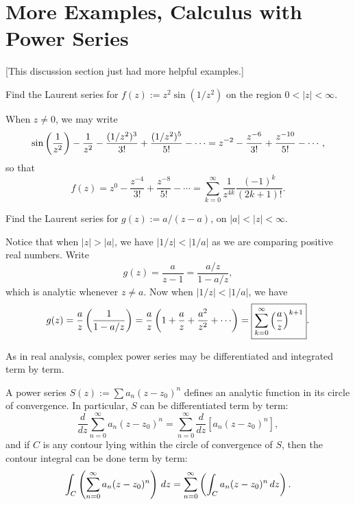 \documentclass{article}
\begin{document}
\section{More Examples, Calculus with Power Series}
[This discussion section just had more helpful examples.]
\begin{example}
Find the Laurent series for $f(z) := z^2\sin(1/z^2 )$ on the region $0<|z|<\infty$.
\end{example}
\begin{solution}
When $z\neq 0$, we may write
$$\sin\left(\frac 1{z^2} \right) - \frac 1{z^2} - \frac{(1/z^2)^3}{3!} + \frac{(1/z^2)^5}{5!} - \cdots = z^{-2} - \frac{z^{-6}}{3!} + \frac{z^{-10} }{5!} - \cdots,$$
so that
$$f(z) = z^0 - \frac{z^{-4}}{3!} + \frac{z^{-8}} {5!} - \cdots = \boxed{\sum_{k=0}^\infty \frac 1{z^{4k}} \frac{(-1)^k}{(2k+1)!}}.$$
\end{solution}
\begin{example}
Find the Laurent series for $g(z) := a/(z-a)$, on $|a| < |z| < \infty$.
\end{example}
\begin{solution}
Notice that when $|z| > |a|$, we have $|1/z| < |1/a|$ as we are comparing positive real numbers. Write
$$g(z) = \frac a{z-1} = \frac{a/z}{1-a/z},$$
which is analytic whenever $z\neq a$. Now when $|1/z| < |1/a|$, we have \newpage
$$g(z) = \frac az\paren{\frac 1{1-a/z}} = \frac az\paren{1 + \frac az + \frac{a^2}{z^2}+\cdots} = \boxed{\sum_{k=0}^\infty \paren{\frac az}^{k+1}}.$$
\end{solution}
As in real analysis, complex power series may be differentiated and integrated term by term.
\begin{theorem}
A power series $S(z) := \sum a_n(z-z_0)^n$ defines an analytic function in its circle of convergence. In particular, $S$ can be differentiated term by term:
$$\frac d{dz}\sum_{n=0}^\infty a_n(z-z_0)^n = \sum_{n=0}^\infty \frac d{dz}[a_n(z-z_0)^n],$$
and if $C$ is any contour lying within the circle of convergence of $S$, then the contour integral can be done term by term:
$$\int_C \left(\sum_{n=0}^\infty a_n(z-z_0)^n \right)\, dz = \sum_{n=0}^\infty\left(\int_C a_n(z-z_0)^n \, dz \right).$$
\end{theorem}
\end{document}
